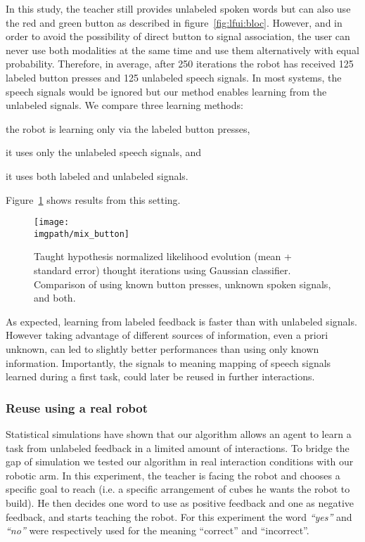 In this study, the teacher still provides unlabeled spoken words but can also use the red and green button as described in figure~\ref{fig:lfui:bloc}. However, and in order to avoid the possibility of direct button to signal association, the user can never use both modalities at the same time and use them alternatively with equal probability. Therefore, in average, after 250 iterations the robot has received 125 labeled button presses and 125 unlabeled speech signals. In most systems, the speech signals would be ignored but our method enables learning from the unlabeled signals. We compare three learning methods: \begin{inparaenum}[(1)] \item the robot is learning only via the labeled button presses, \item it uses only the unlabeled speech signals, and \item it uses both labeled and unlabeled signals. \end{inparaenum} Figure~\ref{fig:button} shows results from this setting. 

\begin{figure}[!htbp]
  \centering
  \texttt{[image: \\imgpath/mix\_button]}
  \caption{Taught hypothesis normalized likelihood evolution (mean + standard error) thought iterations using Gaussian classifier. Comparison of using known button presses, unknown spoken signals, and both.}
  \label{fig:button}
\end{figure}

As expected, learning from labeled feedback is faster than with unlabeled signals. However taking advantage of different sources of information, even a priori unknown, can led to slightly better performances than using only known information. Importantly, the signals to meaning mapping of speech signals learned during a first task, could later be reused in further interactions.

\subsubsection{Reuse using a real robot}

Statistical simulations have shown that our algorithm allows an agent to learn a task from unlabeled feedback in a limited amount of interactions. To bridge the gap of simulation we tested our algorithm in real interaction conditions with our robotic arm. In this experiment, the teacher is facing the robot and chooses a specific goal to reach (i.e. a specific arrangement of cubes he wants the robot to build). He then decides one word to use as positive feedback and one as negative feedback, and starts teaching the robot. For this experiment the word \textit{``yes''} and \textit{``no''} were respectively used for the meaning ``correct'' and ``incorrect''. 

